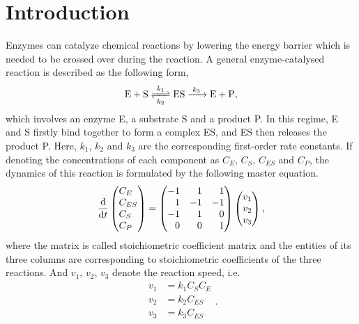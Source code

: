 \section{Introduction}
	Enzymes can catalyze chemical reactions by lowering the energy barrier which is needed to be crossed over during the reaction. A general enzyme-catalysed reaction is described as the following form,
	\begin{equation}
	\ce{E + S <=>[$k_1$][$k_2$] ES ->[$k_3$] E + P},
	\label{eq:chemical}
	\end{equation}
	which involves an enzyme E, a substrate S and a product P. In this regime, E and S firstly bind together to form a complex ES, and ES then releases the product P. Here, $k_1$, $k_2$ and $k_3$ are the corresponding first-order rate constants. If denoting the concentrations of each component as $C_E$, $C_S$, $C_{ES}$ and $C_P$, the dynamics of this reaction is formulated by the following master equation.
	\begin{equation}
	\dv{}{t}\begin{pmatrix*}[l] C_E \\ C_{ES} \\ C_S \\ C_P \end{pmatrix*} = 
		\begin{pmatrix*}[r]
			-1 &  1 &  1 \\
			 1 & -1 & -1 \\
			-1 &  1 &  0 \\
			 0 &  0 &  1 
		\end{pmatrix*}
		\begin{pmatrix} v_1 \\ v_2 \\ v_3\end{pmatrix},
	\label{eq: original_equation}
	\end{equation} 
	where the matrix is called stoichiometric coefficient matrix and the entities of its three columns are corresponding to stoichiometric coefficients of the three reactions. And $v_1$, $v_2$, $v_3$ denote the reaction speed, i.e.
	\begin{equation}
		\begin{aligned}
			v_1 &= k_1 C_S C_E \\
			v_2 &= k_2 C_{ES} \\
			v_3 &= k_3 C_{ES} \\
		\end{aligned}.
	\end{equation}

